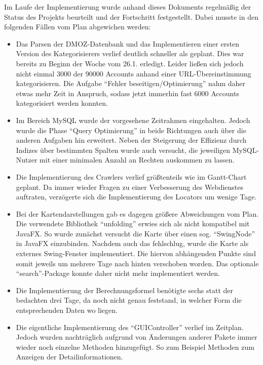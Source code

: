 Im Laufe der Implementierung wurde anhand dieses Dokuments regelmäßig der Status des Projekts beurteilt und der Fortschritt festgestellt. Dabei musste in den folgenden Fällen vom Plan abgewichen werden:
\begin{itemize}
	\item Das Parsen der DMOZ-Datenbank und das Implementieren einer ersten Version des Kategorisierers verlief deutlich schneller als geplant. Dies war bereits zu Beginn der Woche vom 26.1. erledigt. Leider ließen sich jedoch nicht einmal 3000 der 90000 Accounts anhand einer URL-Übereinstimmung kategorisieren. Die Aufgabe "`Fehler beseitigen/Optimierung"' nahm daher etwas mehr Zeit in Anspruch, sodass jetzt immerhin fast 6000 Accounts kategorisiert werden konnten.
	\item Im Bereich MySQL wurde der vorgesehene Zeitrahmen eingehalten. Jedoch wurde die Phase "`Query Optimierung"' in beide Richtungen auch über die anderen Aufgaben hin erweitert. Neben der Steigerung der Effizienz durch Indizes über bestimmten Spalten wurde auch versucht, die jeweiligen MySQL-Nutzer mit einer minimalen Anzahl an Rechten auskommen zu lassen.
	\item Die Implementierung des Crawlers verlief größtenteils wie im Gantt-Chart geplant. Da immer wieder Fragen zu einer Verbesserung des Webdienstes auftraten, verzögerte sich die Implementierung des Locators um wenige Tage.
	\item Bei der Kartendarstellungen gab es dagegen größere Abweichungen vom Plan. Die verwendete Bibliothek "`unfolding"' erwies sich als nicht kompatibel mit JavaFX. So wurde zunächst versucht die Karte über einen sog. "`SwingNode"' in JavaFX einzubinden. Nachdem auch das fehlschlug, wurde die Karte als externes Swing-Fenster implementiert. Die hiervon abhängenden Punkte sind somit jeweils um mehrere Tage nach hinten verschoben worden. Das optionale "`search"'-Package konnte daher nicht mehr implementiert werden.
	\item Die Implementierung der Berechnungsformel benötigte sechs statt der bedachten drei Tage, da noch nicht genau feststand, in welcher Form die entsprechenden Daten wo liegen.
	\item Die eigentliche Implementierung des "`GUIController"' verlief im Zeitplan. Jedoch wurden nachträglich aufgrund von Änderungen anderer Pakete immer wieder noch einzelne Methoden hinzugefügt. So zum Beispiel Methoden zum Anzeigen der Detailinformationen.
\end{itemize}

